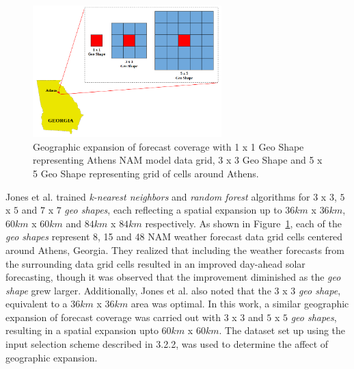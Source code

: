 \begin{figure}[ht]
    \begin{center}
    	\includegraphics[width=0.65\textwidth]{chapter3/fig_geoshapes.png}
    	\caption[Geographic expansion of forecast coverage around Athens NAM model data grid]{Geographic expansion of forecast coverage with 1 x 1 Geo Shape representing Athens NAM model data grid, 3 x 3 Geo Shape and 5 x 5 Geo Shape representing grid of cells around Athens.}
    	\label{fig:fig_geoshapes}
    \end{center}
\end{figure}

\par Jones et al. trained \textit{k-nearest neighbors} and \textit{random forest} algorithms for $3$ x $3$, $5$ x $5$ and $7$ x $7$ \textit{geo shapes}, each reflecting a spatial expansion up to $36km$ x $36km$, $60km$ x $60km$ and $84km$ x $84km$ respectively. As shown in Figure~\ref{fig:fig_geoshapes}, each of the \textit{geo shapes} represent 8, 15 and 48 NAM weather forecast data grid cells centered around Athens, Georgia. They realized that including the weather forecasts from the surrounding data grid cells resulted in an improved day-ahead solar forecasting, though it was observed that the improvement diminished as the \textit{geo shape} grew larger. Additionally, Jones et al. also noted that the $3$ x $3$ \textit{geo shape}, equivalent to a $36km$ x $36km$ area was optimal. In this work, a similar geographic expansion of forecast coverage was carried out with $3$ x $3$ and $5$ x $5$ \textit{geo shapes}, resulting in a spatial expansion upto $60km$ x $60km$. The dataset set up using the input selection scheme described in 3.2.2, was used to determine the affect of geographic expansion.

